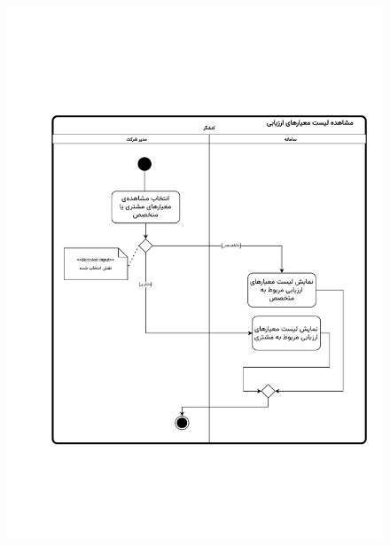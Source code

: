 \begin{figure}[ht!]
	\centering
	\includegraphics[scale=0.8, page=1]{figs/OOD-activity-viewevalmetric.pdf}
\end{figure}
\FloatBarrier
\newpage

